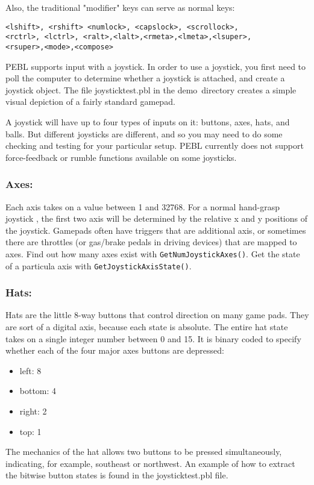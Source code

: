 Also, the traditional "modifier" keys can serve as normal keys:


\begin{verbatim}
<lshift>, <rshift> <numlock>, <capslock>, <scrollock>, 
<rctrl>, <lctrl>, <ralt>,<lalt>,<rmeta>,<lmeta>,<lsuper>,
<rsuper>,<mode>,<compose>

\end{verbatim}


PEBL supports input with a joystick. In order to use a joystick, you first need to poll the computer to determine whether a joystick is attached, and create a joystick object.  The file joysticktest.pbl in the demo\ directory creates a simple visual depiction of a fairly standard gamepad.


A joystick will have up to four types of inputs on it: buttons, axes, hats, and balls.  But different joysticks are different, and so you may need to do some checking and testing for your particular setup.  PEBL currently does not support force-feedback or rumble functions available on some joysticks.

\subsubsection{Axes:} 
Each axis takes on a value between 1 and 32768. For a  normal hand-grasp joystick , the first two axis will be determined by the relative x and y positions of the joystick.  Gamepads often have triggers that are additional axis, or sometimes there are throttles (or gas/brake pedals in driving devices) that are mapped to axes.
Find out how many axes exist with \texttt{GetNumJoystickAxes()}.  Get the state of a particula axis with \texttt{GetJoystickAxisState()}.  


\subsubsection{Hats:}
  Hats are the little 8-way buttons that control direction on many game pads.  They are sort of a digital axis, because each state is absolute.  The entire hat state takes on a single integer number between 0 and 15.  It is binary coded to specify whether each of the four major axes buttons are depressed:
\begin{itemize}
\item left: 8
\item bottom: 4
\item right: 2
\item top: 1
\end{itemize}
The mechanics of the hat allows two buttons to be pressed simultaneously, indicating, for example, southeast or northwest.  An example of how to extract the bitwise button states is found in the joysticktest.pbl file.

